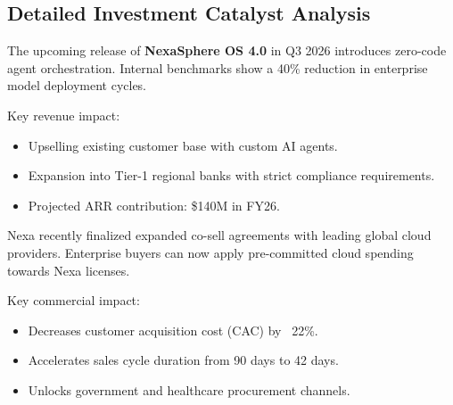\documentclass[10pt,a4paper]{scrartcl}
\begin{document}
\newpage

\textcolor{NavyPrimary}{\section*{Detailed Investment Catalyst Analysis}}

\begin{minipage}[t]{0.48\textwidth}
    \vspace{0pt}
    \begin{tcolorbox}[calloutbox, title=\textcolor{NavyPrimary}{Catalyst 1: NexaSphere OS 4.0 Rollout}, colframe=NavyPrimary, colbacktitle=LightBlueBg, coltitle=NavyPrimary]
        \small
        The upcoming release of \textbf{NexaSphere OS 4.0} in Q3 2026 introduces zero-code agent orchestration. Internal benchmarks show a 40\% reduction in enterprise model deployment cycles.
        
        \vspace{4pt}
        Key revenue impact:
        \begin{itemize}[leftmargin=10pt, itemsep=2pt]
            \item Upselling existing customer base with custom AI agents.
            \item Expansion into Tier-1 regional banks with strict compliance requirements.
            \item Projected ARR contribution: \$140M in FY26.
        \end{itemize}
    \end{tcolorbox}
\end{minipage}%
\hfill
\begin{minipage}[t]{0.48\textwidth}
    \vspace{0pt}
    \begin{tcolorbox}[calloutbox, title=\textcolor{NavyPrimary}{Catalyst 2: Hyperscaler Channel Partnerships}, colframe=NavyPrimary, colbacktitle=LightBlueBg, coltitle=NavyPrimary]
        \small
        Nexa recently finalized expanded co-sell agreements with leading global cloud providers. Enterprise buyers can now apply pre-committed cloud spending towards Nexa licenses.

        \vspace{4pt}
        Key commercial impact:
        \begin{itemize}[leftmargin=10pt, itemsep=2pt]
            \item Decreases customer acquisition cost (CAC) by ~22\%.
            \item Accelerates sales cycle duration from 90 days to 42 days.
            \item Unlocks government and healthcare procurement channels.
        \end{itemize}
    \end{tcolorbox}
\end{minipage}
\end{document}
